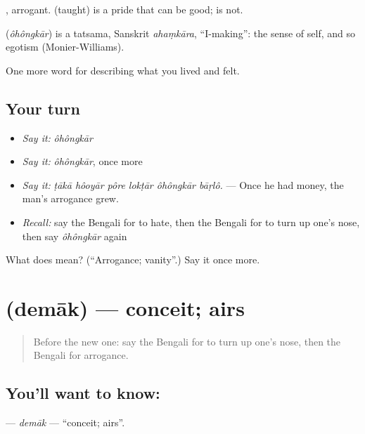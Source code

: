, arrogant.  (taught) is a pride that can be good;  is not.

\begin{cousinweb}
\textbf{} (\emph{ôhôngkār}) is a tatsama, Sanskrit \emph{ahaṃkāra}, \textquotedblleft{}I-making\textquotedblright{}: the sense of self, and so egotism (Monier-Williams).
\end{cousinweb}

\begin{grammarlens}[title={What you've built}]
One more word for describing what you lived and felt.
\end{grammarlens}

\subsection*{Your turn}
\begin{itemize}
\raggedright
  \item \emph{Say it:} \emph{ôhôngkār}
  \item \emph{Say it:} \emph{ôhôngkār}, once more
  \item \emph{Say it:} \emph{ṭākā hôoyār pôre lokṭār ôhôngkār bāṛlô.} — Once he had money, the man's arrogance grew.
  \item \emph{Recall:} say the Bengali for to hate, then the Bengali for to turn up one's nose, then say \emph{ôhôngkār} again
\end{itemize}

\begin{tcolorbox}[breakable,colback=teal!4,colframe=teal!35!black,title={Before you move on}]
What does  mean? (\textquotedblleft{}Arrogance; vanity\textquotedblright{}.) Say it once more.
\end{tcolorbox}
\section[\texorpdfstring{\bn{দেমাক} (demāk)}{দেমাক (demāk)}]{ (demāk) — conceit; airs}

\label{lesson:BN-C452-demak}



\begin{quote}
Before the new one: say the Bengali for to turn up one's nose, then the Bengali for arrogance.
\end{quote}

\subsection*{You'll want to know: }
\textbf{} — \emph{demāk} — \textquotedblleft{}conceit; airs\textquotedblright{}.

